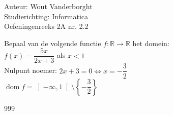\documentclass[a4paper]{article}
\newcommand{\R}{\mathbb{R}}
\begin{document}
  
\noindent \large Auteur: Wout Vanderborght\\
\noindent \large Studierichting: Informatica\\
\noindent \large Oefeningenreeks 2A nr. 2.2\\

\medskip

\normalsize

Bepaal van de volgende functie $f: \R \rightarrow \R$ het domein: \\

$ f(x) = \dfrac{5x}{2x + 3} $ als $ x < 1 $ \\

Nulpunt noemer: $ 2x + 3 = 0 \Leftrightarrow x = -\dfrac{3}{2} $ \\

$ \operatorname{dom} f = \left]-\infty, 1\right[ \setminus \left\{-\dfrac{3}{2}\right\} $ \\

\begin{thebibliography}{999}
\end{thebibliography}
\end{document}

